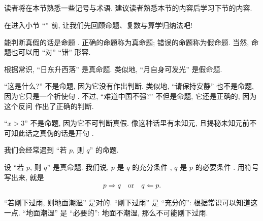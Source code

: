 \subsection*{\Prerequisites}
\markright{\Prerequisites}

读者将在本节熟悉一些记号与术语. 建议读者熟悉本节的内容后学习下节的内容.

在进入小节 ``\Sets '' 前, 让我们先回顾命题、复数与算学归纳法吧!

\begin{definition}
    能判断真假的话是命题 . 正确的命题称为真命题; 错误的命题称为假命题. 当然, 命题也可以用 ``对'' ``错'' 形容.
\end{definition}

\begin{example}
    根据常识, ``日东升西落'' 是真命题. 类似地, ``月自身可发光'' 是假命题.

    ``这是什么?'' 不是命题, 因为它没有作出判断. 类似地, ``请保持安静'' 也不是命题, 因为它只是一个祈使句 . 不过, ``难道中国不强?'' 不但是命题, 它还是正确的, 因为这个反问  作出了正确的判断.

    ``$x > 3$'' 不是命题, 因为它不可判断真假. 像这种话里有未知元, 且揭秘未知元前不可知此话之真伪的话是开句 .
\end{example}

我们会经常遇到 ``若 $p$, 则 $q$'' 的命题.

\begin{definition}
    设 ``若 $p$, 则 $q$'' 是真命题. 我们说, $p$ 是 $q$ 的充分条件 , $q$ 是 $p$ 的必要条件 . 用符号写出来, 就是
    \begin{align*}
        p \Rightarrow q \quad \text{or} \quad q \Leftarrow p.
    \end{align*}
\end{definition}

\begin{example}
    ``若刚下过雨, 则地面潮湿'' 是对的. ``刚下过雨'' 是 ``充分的'': 根据常识可以知道这一点. ``地面潮湿'' 是 ``必要的'': 地面不潮湿, 那么不可能刚下过雨.
\end{example}

